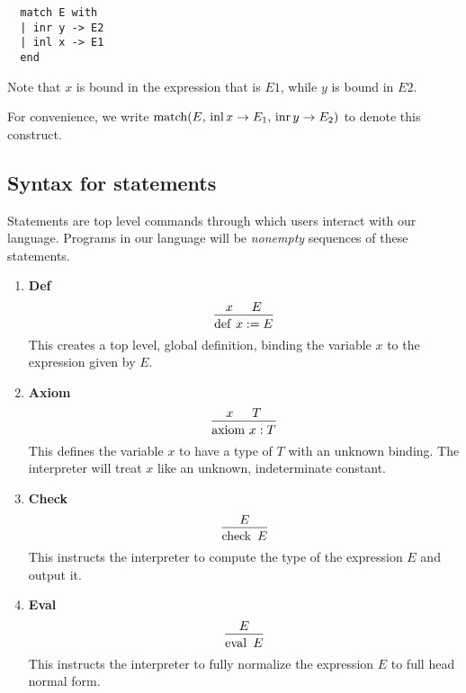 \documentclass{article}
\begin{document}
\begin{enumerate}
\begin{verbatim}
  match E with
  | inr y -> E2
  | inl x -> E1
  end
\end{verbatim}

Note that $x$ is bound in the expression that is $E1$, while $y$ is bound in $E2$.

For convenience, we write 
$\operatorname{match}(E, \, \operatorname{inl} x \rightarrow E_1, \, \operatorname{inr} y \rightarrow E_2)$ to denote this
construct.

\end{enumerate}

\subsection{Syntax for statements}
Statements are top level commands through which users interact with our
language. Programs in our language will be \textit{nonempty} sequences of
these statements.

\begin{enumerate}
\item \textbf{Def} \\
\[
  \begin{prooftree}
    \hypo{x}
    \hypo{E}
    \infer2{\deff \, x := E}
  \end{prooftree}
\]
This creates a top level, global definition, binding the variable $x$ to the
expression given by $E$.

\item \textbf{Axiom} \\
\[
  \begin{prooftree}
    \hypo{x}
    \hypo{T}
    \infer2{\axiom \, x : T}
  \end{prooftree}
\]
This defines the variable $x$ to have a type of $T$ with an unknown binding.
The interpreter will treat $x$ like an unknown, indeterminate constant.

\item \textbf{Check} \\
\[
  \begin{prooftree}
    \hypo{E}
    \infer1{\checkk \,\, E}
  \end{prooftree}
\]
This instructs the interpreter to compute the type of the expression $E$ and
output it.

\item \textbf{Eval} \\
\[
  \begin{prooftree}
    \hypo{E}
    \infer1{\evall \,\, E}
  \end{prooftree}
\]
This instructs the interpreter to fully normalize the expression $E$ to full
head normal form.

\end{enumerate}
\end{document}
